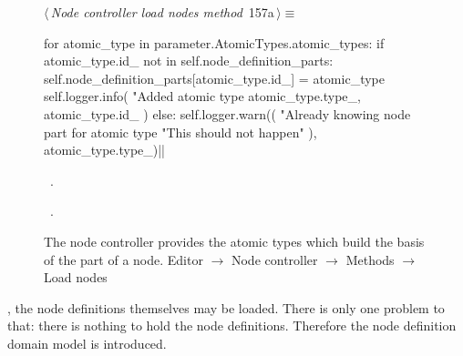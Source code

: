 \documentclass[%
    a4paper,    %
    justified,  %
    nobib,      %
    openany     %
]{tufte-book}
\makeatletter
\renewcommand{\label}[1]{\@tufte@label{##1}}%
\makeatother
\begin{document}
\begin{figure}[!htbp]
\begin{flushleft} \small
\begin{minipage}{\linewidth}\label{scrap118}\raggedright\small
{} $\langle\,${\itshape Node controller load nodes method}\nobreak\ {\footnotesize {157a}}$\,\rangle\equiv$
\vspace{-1ex}
\begin{pythoncode}
for atomic_type in parameter.AtomicTypes.atomic_types:
    if atomic_type.id_ not in self.node_definition_parts:
        self.node_definition_parts[atomic_type.id_] = atomic_type
        self.logger.info(
            "Added atomic type %
            atomic_type.type_, atomic_type.id_
        )
    else:
        self.logger.warn((
            "Already knowing node part for atomic type %
            "This should not happen"
        ), atomic_type.type_)|\NWsep|
\end{pythoncode}
\vspace{1.5ex}
\footnotesize
\begin{list}{}{\setlength{\itemsep}{-\parsep}\setlength{\itemindent}{-\leftmargin}}
\item \NWtxtMacroDefBy\ .
\item \NWtxtMacroRefIn\ .

\item{}
\end{list}
\end{minipage}\vspace{4ex}
\end{flushleft}
\caption{The node controller provides the atomic types which build the basis of
  the part of a node.
  \newline{}\newline{}Editor $\rightarrow$ Node controller $\rightarrow$ Methods
  $\rightarrow$ Load nodes}
\end{figure}

, the node definitions
themselves may be loaded. There is only one problem to that: there is nothing to
hold the node definitions. Therefore the node definition domain model is
introduced.
\end{document}
